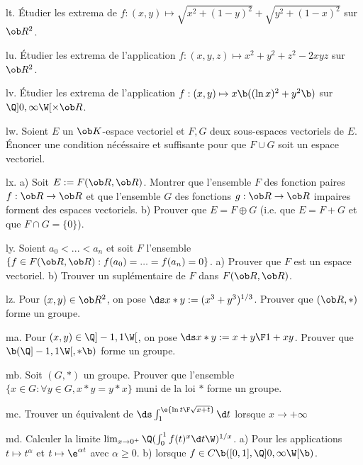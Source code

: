 \exo [Level=2,Fight=1,Learn=1,Type=\Exercices,Field=\Extrema,Origin=] lt. 
\'Etudier les extrema de $f:(x,y)\mapsto\sqrt{x^2+(1-y)^2}+\sqrt{y^2+(1-x)^2}$ sur $\ob R^2$. 

\exo [Level=2,Fight=1,Learn=1,Type=\Exercices,Field=\Extrema,Origin=] lu. 
\'Etudier les extrema de l'application $f:(x,y,z)\mapsto x^2+y^2+z^2-2xyz$ sur $\ob R^2$. 

\exo [Level=2,Fight=1,Learn=1,Type=\Exercices,Field=\Extrema,Origin=] lv. 
\'Etudier les extrema de l'application $f:(x,y)\mapsto x\b((\ln x)^2 +y^2\b)$ sur $\Q]0,\infty\W[\times\ob R$. 

\exo [Level=1,Fight=1,Learn=1,Type=\Exercices,Field=\EspacesVectoriels,Origin=] lw. 
Soient $E$ un $\ob K$-espace vectoriel et $F,G$ deux sous-espaces vectoriels de $E$. \'Enoncer une condition nécéssaire et suffisante pour que $F\cup G$ 
soit un espace vectoriel. 

\exo [Level=1,Fight=1,Learn=1,Type=\Exercices,Field=\EspacesVectoriels,Origin=] lx. 
a) Soit $E:=\sc F(\ob R,\ob R)$. Montrer que l'ensemble $F$ des fonction paires $f:\ob R\to\ob R$ 
et que l'ensemble $G$ des fonctions $g:\ob R\to\ob R$ impaires
forment des espaces vectoriels. \pn 
b) Prouver que $E=F\oplus G$ (i.e. que $E=F+G$ et que $F\cap G=\{0\}$). 

\exo [Origin=,Level=1,Fight=1,Learn=2,Type=\Colles,Field=\EspacesVectoriels] ly. 
Soient $a_0<...<a_n$ et soit $F$ l'ensemble $\{f\in\sc F(\ob R,\ob R):f(a_0)=...=f(a_n)=0\}$. \pn
a) Prouver que $F$ est un espace vectoriel. \pn
b) Trouver un suplémentaire de $F$ dans $\sc F(\ob R,\ob R)$. 


\exo [Level=1,Fight=1,Learn=1,Type=\Exercices,Field=\Groupes,Origin=] lz. 
Pour $(x,y)\in\ob R^2$, on pose $\ds x*y:=(x^3+y^3)^{1/3}$. 
Prouver que $(\ob R,*)$ forme un groupe. 

\exo [Level=1,Fight=1,Learn=1,Type=\Exercices,Field=\Groupes,Origin=] ma. 
Pour $(x,y)\in\Q]-1,1\W[$, on pose $\ds x*y:={x+y\F1+xy}$. Prouver que $\b(\Q]-1,1\W[,*\b)$ forme un groupe. 

\exo [Level=1,Fight=1,Learn=1,Type=\Exercices,Field=\Groupes,Origin=] mb. 
Soit $(G,*)$ un groupe. Prouver que l'ensemble $\{x\in G:\forall y\in G, x*y=y*x\}$ muni de la loi $*$ 
forme un groupe. 

\exo [Level=2,Fight=1,Learn=1,Type=\Exercices,Field=\FonctionsDéfiniesParUneIntégrale,Origin=] mc. 
Trouver un équivalent de $\ds \int_1^\e{\ln t\F\sqrt{x+t}}\d t$ lorsque $x\to+\infty$

\exo [Level=1,Fight=3,Learn=1,Type=\Exercices,Field=\Intégration,Origin=] md. 
Calculer la limite $\lim_{x\to 0^+}\Q(\int_0^1f(t)^x\d t\W)^{1/x}$. \pn
a) Pour les applications $t\mapsto t^\alpha$ et $t\mapsto \e^{\alpha t}$ avec $\alpha\ge0$. \pn
b) lorsque $f\in\sc C\b([0,1],\Q]0,\infty\W[\b)$. 


